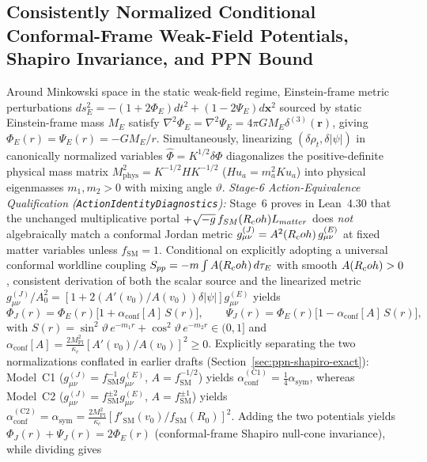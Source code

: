 \subsection{Consistently Normalized Conditional Conformal-Frame Weak-Field Potentials, Shapiro Invariance, and PPN Bound}
\label{app:ppn-derivation}

Around Minkowski space in the static weak-field regime, Einstein-frame metric perturbations $ds_E^2 = -(1 + 2\Phi_E)dt^2 + (1 - 2\Psi_E)d\mathbf{x}^2$ sourced by static Einstein-frame mass $M_E$ satisfy $\nabla^2\Phi_E = \nabla^2\Psi_E = 4\pi G M_E \delta^{(3)}(\mathbf{r})$, giving $\Phi_E(r) = \Psi_E(r) = -G M_E / r$. Simultaneously, linearizing $(\delta\rho_t, \delta|\psi|)$ in canonically normalized variables $\hat{\Phi} = K^{1/2}\delta\Phi$ diagonalizes the positive-definite physical mass matrix $M_{\mathrm{phys}}^2 = K^{-1/2} H K^{-1/2}$ ($H u_a = m_a^2 K u_a$) into physical eigenmasses $m_1, m_2 > 0$ with mixing angle $\vartheta$. \emph{Stage-6 Action-Equivalence Qualification (\texttt{ActionIdentityDiagnostics}):} Stage~6 proves in Lean~4.30 that the unchanged multiplicative portal $+\sqrt{-g}\,f_{SM}(R_coh)L_{matter}$ does \emph{not} algebraically match a conformal Jordan metric $g_{\mu\nu}^{(J)} = A^2(R_coh)\,g_{\mu\nu}^{(E)}$ at fixed matter variables unless $f_{\mathrm{SM}} = 1$. Conditional on explicitly adopting a universal conformal worldline coupling $S_{pp} = -m\int A(R_coh)\,d\tau_E$ with smooth $A(R_coh) > 0$, consistent derivation of both the scalar source and the linearized metric $g_{\mu\nu}^{(J)}/A_0^2 = [1 + 2(A'(v_0)/A(v_0))\delta|\psi|]g_{\mu\nu}^{(E)}$ yields
\begin{equation}
\Phi_J(r) = \Phi_E(r)\bigl[1 + \alpha_{\mathrm{conf}}[A]\,S(r)\bigr],
\qquad
\Psi_J(r) = \Phi_E(r)\bigl[1 - \alpha_{\mathrm{conf}}[A]\,S(r)\bigr],
\label{eq:appD_jordan_potentials}
\end{equation}
with $S(r) = \sin^2\vartheta\,e^{-m_1 r} + \cos^2\vartheta\,e^{-m_2 r} \in (0, 1]$ and $\alpha_{\mathrm{conf}}[A] = \frac{2 M_{\mathrm{Pl}}^2}{\kappa_c}[A'(v_0)/A(v_0)]^2 \ge 0$. Explicitly separating the two normalizations conflated in earlier drafts (Section~\ref{sec:ppn-shapiro-exact}): Model~C1 ($g_{\mu\nu}^{(J)} = f_{\mathrm{SM}}^{-1}g_{\mu\nu}^{(E)}$, $A = f_{\mathrm{SM}}^{-1/2}$) yields $\alpha_{\mathrm{conf}}^{(\mathrm{C1})} = \frac{1}{4}\alpha_{\mathrm{sym}}$, whereas Model~C2 ($g_{\mu\nu}^{(J)} = f_{\mathrm{SM}}^{\pm 2}g_{\mu\nu}^{(E)}$, $A = f_{\mathrm{SM}}^{\pm 1}$) yields $\alpha_{\mathrm{conf}}^{(\mathrm{C2})} = \alpha_{\mathrm{sym}} = \frac{2 M_{\mathrm{Pl}}^2}{\kappa_c}[f'_{\mathrm{SM}}(v_0)/f_{\mathrm{SM}}(R_0)]^2$. Adding the two potentials yields $\Phi_J(r) + \Psi_J(r) = 2\Phi_E(r)$ (conformal-frame Shapiro null-cone invariance), while dividing gives
